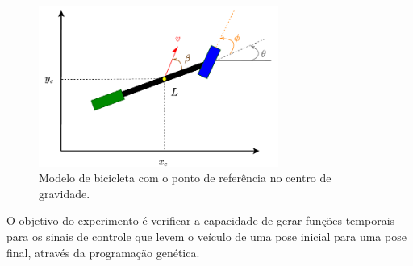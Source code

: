 \begin{figure}[H]
	\centering
	\includegraphics[width=0.7\textwidth]{02_desenvolvimento/04_EC_Fig_CarrinhoModeloBic}
	\caption{Modelo de bicicleta com o ponto de referência no centro de gravidade.}
	\label{fig:4ec-carrinhofigsisteq}
\end{figure}


O objetivo do experimento é verificar a capacidade de gerar funções temporais para os sinais de controle que levem o veículo de uma pose inicial para uma pose final, através da programação genética.

%
%
%
%

